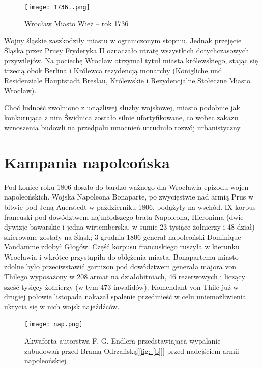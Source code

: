 \documentclass{article}
\begin{document}
\begin{center}
\begin{figure}[h]
	\centering
	\texttt{[image: 1736..png]}
	\caption{Wrocław Miasto Wież – rok 1736}
\end{figure}
\end{center}
Wojny śląskie zaszkodziły miastu w ograniczonym stopniu. Jednak przejęcie Śląska przez Prusy Fryderyka II oznaczało utratę wszystkich dotychczasowych przywilejów. Na pociechę Wrocław otrzymał tytuł miasta królewskiego, stając się trzecią obok Berlina i Królewca rezydencją monarchy (Königliche und Residenziale Hauptstadt Breslau, Królewskie i Rezydencjalne Stołeczne Miasto Wrocław).

Choć ludność zwolniono z uciążliwej służby wojskowej, miasto podobnie jak konkurująca z nim Świdnica zostało silnie ufortyfikowane, co wobec zakazu wznoszenia budowli na przedpolu umocnień utrudniło rozwój urbanistyczny.


\section {Kampania napoleońska}

Pod koniec roku 1806 doszło do bardzo ważnego dla Wrocławia epizodu wojen napoleońskich. Wojska Napoleona Bonaparte, po zwycięstwie nad armią Prus w bitwie pod Jeną-Auerstedt w październiku 1806, podążyły na wschód. IX korpus francuski pod dowództwem najmłodszego brata Napoleona, Hieronima (dwie dywizje bawarskie i jedna wirtemberska, w sumie 23 tysiące żołnierzy i 48 dział) skierowane zostały na Śląsk; 3 grudnia 1806 generał napoleoński Dominique Vandamme zdobył Głogów. Część korpusu francuskiego ruszyła w kierunku Wrocławia i wkrótce przystąpiła do oblężenia miasta. Bonapartemu miasto zdolne było przeciwstawić garnizon pod dowództwem generała majora von Thilego wyposażony w 208 armat na działobitniach, 46 rezerwowych i liczący sześć tysięcy żołnierzy (w tym 473 inwalidów). Komendant von Thile już w drugiej połowie listopada nakazał spalenie przedmieść w celu uniemożliwienia ukrycia się w nich wojsk najeźdźców.

\begin{center}
\begin{figure}[h]
	\centering
	\texttt{[image: nap.png]}
	\caption{Akwaforta autorstwa F. G. Endlera przedstawiająca wypalanie zabudowań przed Bramą Odrzańską[\ref{fig: [b]}] przed nadejściem armii napoleońskiej}
\end{figure}
\end{center}
\end{document}
